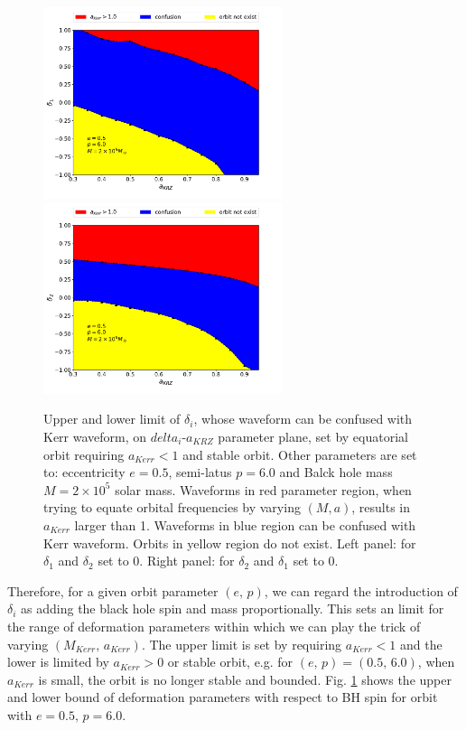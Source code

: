 \documentclass{article}
\begin{document}
\begin{figure}[!ht]
	\centering
	\includegraphics[width=7cm]{2D_bound.pdf}
	\includegraphics[width=7cm]{2D_bound_d2.pdf}
	
	\caption{Upper and lower limit of $\delta_i$, whose waveform can be confused with Kerr waveform, on $delta_i$-$a_{KRZ}$ parameter plane, set by equatorial orbit requiring $a_{Kerr}<1$ and stable orbit. Other parameters are set to: eccentricity $e=0.5$, semi-latus $p=6.0$ and Balck hole mass $M=2\times10^5$ solar mass. Waveforms in red parameter region, when trying to equate orbital frequencies by varying $(M,a)$, results in $a_{Kerr}$ larger than 1. Waveforms in blue region can be confused with Kerr waveform. Orbits in yellow region do not exist. Left panel: for $\delta_1$ and $\delta_2$ set to 0. Right panel: for $\delta_2$ and $\delta_1$ set to 0. }
	\label{d2limit}
\end{figure}

Therefore, for a given orbit parameter $(e,\, p)$, we can regard the introduction of $\delta_i$ as adding the black hole spin and mass proportionally. This sets an limit for the range of deformation parameters within which we can play the trick of varying $(M_{Kerr},\, a_{Kerr})$. The upper limit is set by requiring $a_{Kerr}<1$ and the lower is limited by $a_{Kerr}>0$ or stable orbit, e.g. for $(e,\, p)=(0.5,\, 6.0)$, when $a_{Kerr}$ is small, the orbit is no longer stable and bounded. Fig. \ref{d2limit} shows the upper and lower bound of deformation parameters with respect to BH spin for orbit with $e=0.5,\, p=6.0$. 
\end{document}
